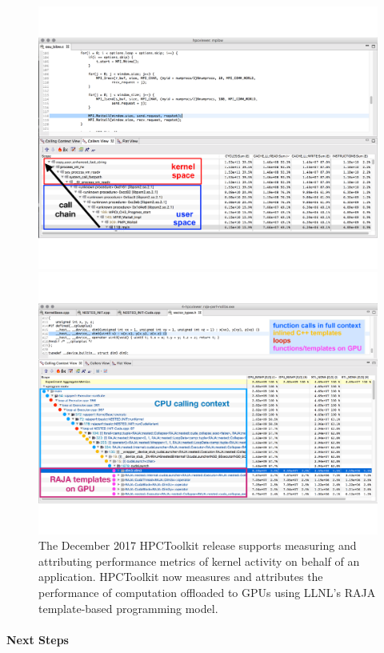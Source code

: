 \begin{figure}[t]
\centering
\begin{subfloat}%
\centering
\includegraphics[width=.48\textwidth]{projects/2.3.2-Tools/2.3.2.08-HPCToolkit/hpctoolkit-kernel}
\end{subfloat}
\hfill
\begin{subfloat}%
\centering
\includegraphics[width=.48\textwidth]{projects/2.3.2-Tools/2.3.2.08-HPCToolkit/hpctoolkit-perfsuite}
\end{subfloat}
\caption{The December 2017 HPCToolkit release supports measuring and attributing performance metrics of kernel activity on behalf of an application.  HPCToolkit now measures and attributes the performance of computation offloaded to GPUs using LLNL's RAJA template-based programming model.}
\end{figure}
\vspace{-1ex}

\paragraph{Next Steps}


